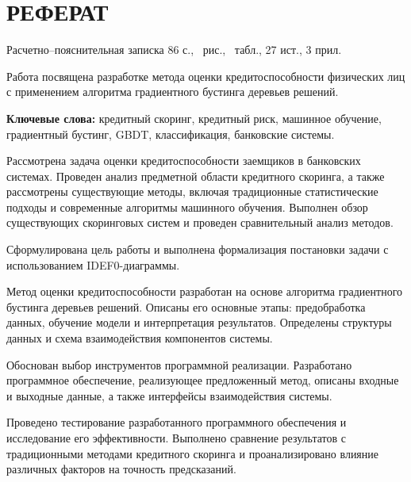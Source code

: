 \section*{РЕФЕРАТ}

Расчетно--пояснительная записка 86 с., \totalfigures\ рис., \totaltables\ табл., 27 ист., 3 прил.

Работа посвящена разработке метода оценки кредитоспособности физических лиц с применением алгоритма градиентного бустинга деревьев решений.

\textbf{Ключевые слова:} кредитный скоринг, кредитный риск, машинное обучение, градиентный бустинг, GBDT, классификация, банковские системы.

Рассмотрена задача оценки кредитоспособности заемщиков в банковских системах. Проведен анализ предметной области кредитного скоринга, а также рассмотрены существующие методы, включая традиционные статистические подходы и современные алгоритмы машинного обучения. Выполнен обзор существующих скоринговых систем и проведен сравнительный анализ методов.

Сформулирована цель работы и выполнена формализация постановки задачи с использованием IDEF0-диаграммы.

Метод оценки кредитоспособности разработан на основе алгоритма градиентного бустинга деревьев решений. Описаны его основные этапы: предобработка данных, обучение модели и интерпретация результатов. Определены структуры данных и схема взаимодействия компонентов системы.

Обоснован выбор инструментов программной реализации. Разработано программное обеспечение, реализующее предложенный метод, описаны входные и выходные данные, а также интерфейсы взаимодействия системы.

Проведено тестирование разработанного программного обеспечения и исследование его эффективности. Выполнено сравнение результатов с традиционными методами кредитного скоринга и проанализировано влияние различных факторов на точность предсказаний.
